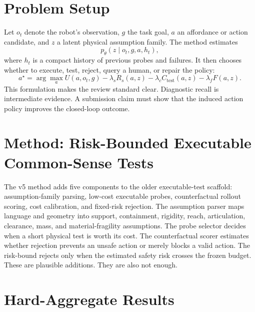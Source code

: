 \documentclass{article}
\begin{document}
\section{Problem Setup}
Let $o_t$ denote the robot's observation, $g$ the task goal, $a$ an affordance or action candidate, and $z$ a latent physical assumption family. The method estimates
\[
  p_\theta(z \mid o_t, g, a, h_t),
\]
where $h_t$ is a compact history of previous probes and failures. It then chooses whether to execute, test, reject, query a human, or repair the policy:
\[
  a^\star = \arg\max_a U(a,o_t,g) - \lambda_s R_s(a,z) - \lambda_c C_{\mathrm{test}}(a,z) - \lambda_f F(a,z).
\]
This formulation makes the review standard clear. Diagnostic recall is intermediate evidence. A submission claim must show that the induced action policy improves the closed-loop outcome.

\section{Method: Risk-Bounded Executable Common-Sense Tests}
The v5 method adds five components to the older executable-test scaffold: assumption-family parsing, low-cost executable probes, counterfactual rollout scoring, cost calibration, and fixed-risk rejection. The assumption parser maps language and geometry into support, containment, rigidity, reach, articulation, clearance, mass, and material-fragility assumptions. The probe selector decides when a short physical test is worth its cost. The counterfactual scorer estimates whether rejection prevents an unsafe action or merely blocks a valid action. The risk-bound rejects only when the estimated safety risk crosses the frozen budget. These are plausible additions. They are also not enough.

\section{Hard-Aggregate Results}
\end{document}
